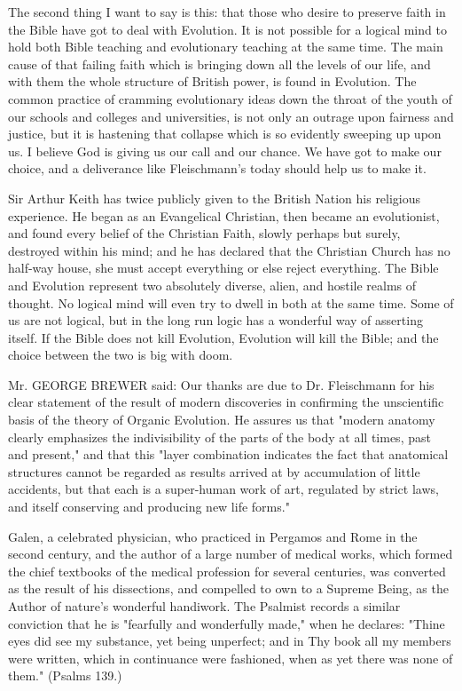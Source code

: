 The second thing I want to say is this: that those who desire to preserve faith in the Bible
have got to deal with Evolution. It is not possible for a logical mind to hold both Bible
teaching and evolutionary teaching at the same time. The main cause of that failing faith
which is bringing down all the levels of our life, and with them the whole structure of British
power, is found in Evolution. The common practice of cramming evolutionary ideas down
the throat of the youth of our schools and colleges and universities, is not only an outrage
upon fairness and justice, but it is hastening that collapse which is so evidently sweeping up
upon us. I believe God is giving us our call and our chance. We have got to make our choice,
and a deliverance like Fleischmann's today should help us to make it.

Sir Arthur Keith has twice publicly given to the British Nation his religious experience. He
began as an Evangelical Christian, then became an evolutionist, and found every belief of the
Christian Faith, slowly perhaps but surely, destroyed within his mind; and he has declared
that the Christian Church has no half-way house, she must accept everything or else reject
everything. The Bible and Evolution represent two absolutely diverse, alien, and hostile
realms of thought. No logical mind will even try to dwell in both at the same time. Some of
us are not logical, but in the long run logic has a wonderful way of asserting itself. If the
Bible does not kill Evolution, Evolution will kill the Bible; and the choice between the two is
big with doom.

Mr. GEORGE BREWER said: Our thanks are due to Dr. Fleischmann for his clear statement
of the result of modern discoveries in confirming the unscientific basis of the theory of
Organic Evolution. He assures us that "modern anatomy clearly emphasizes the indivisibility
of the parts of the body at all times, past and present," and that this "layer combination
indicates the fact that anatomical structures cannot be regarded as results arrived at by
accumulation of little accidents, but that each is a super-human work of art, regulated by
strict laws, and itself conserving and producing new life forms."

Galen, a celebrated physician, who practiced in Pergamos and Rome in the second century,
and the author of a large number of medical works, which formed the chief textbooks of the
medical profession for several centuries, was converted as the result of his dissections, and
compelled to own to a Supreme Being, as the Author of nature's wonderful handiwork. The
Psalmist records a similar conviction that he is "fearfully and wonderfully made," when he
declares: "Thine eyes did see my substance, yet being unperfect; and in Thy book all my
members were written, which in continuance were fashioned, when as yet there was none of
them." (Psalms 139.)

